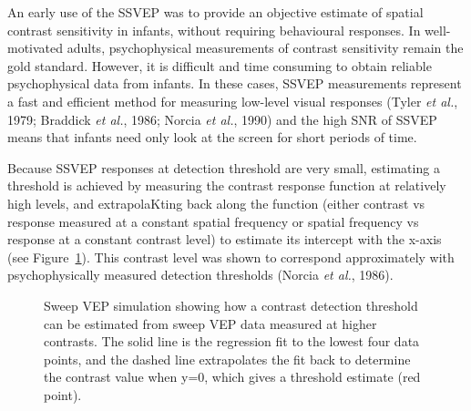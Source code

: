 \documentclass[
  letterpaper,
  DIV=11,
  numbers=noendperiod]{scrartcl}
\begin{document}
An early use of the SSVEP was to provide an objective estimate of
spatial contrast sensitivity in infants, without requiring behavioural
responses. In well-motivated adults, psychophysical measurements of
contrast sensitivity remain the gold standard. However, it is difficult
and time consuming to obtain reliable psychophysical data from infants.
In these cases, SSVEP measurements represent a fast and efficient method
for measuring low-level visual responses (Tyler \emph{et al.}, 1979;
Braddick \emph{et al.}, 1986; Norcia \emph{et al.}, 1990) and the high
SNR of SSVEP means that infants need only look at the screen for short
periods of time.

Because SSVEP responses at detection threshold are very small,
estimating a threshold is achieved by measuring the contrast response
function at relatively high levels, and extrapolaKting back along the
function (either contrast vs response measured at a constant spatial
frequency or spatial frequency vs response at a constant contrast level)
to estimate its intercept with the x-axis (see
Figure~\ref{fig-sweepvep}). This contrast level was shown to correspond
approximately with psychophysically measured detection thresholds
(Norcia \emph{et al.}, 1986).

\begin{figure}


\caption{\label{fig-sweepvep}Sweep VEP simulation showing how a contrast
detection threshold can be estimated from sweep VEP data measured at
higher contrasts. The solid line is the regression fit to the lowest
four data points, and the dashed line extrapolates the fit back to
determine the contrast value when y=0, which gives a threshold estimate
(red point).}

\end{figure}%
\end{document}
